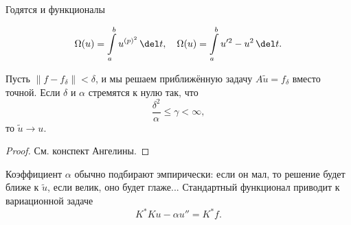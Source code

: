 \documentclass{trlnotes}
\begin{document}
    Годятся и функционалы

    \[
        \Omega(u) = \int\limits_a^b u^{(p)^2} \, \del t, \quad \Omega(u) = \int\limits_a^b u'^2 - u^2 \, \del t.
    \]

    \begin{thm}
        Пусть $\|f - f_{\delta}\| < \delta$, и мы решаем приближённую задачу $A\tilde{u} = f_{\delta}$ вместо точной. Если $\delta$ и $\alpha$ стремятся к нулю так, что 
        \[
            \dfrac{\delta^2}{\alpha} \leqslant \gamma < \infty,
        \]
        то $\tilde{u} \to u$.
        \begin{proof}
            См. конспект Ангелины.
        \end{proof}
    \end{thm}

    Коэффициент $\alpha$ обычно подбирают эмпирически: если он мал, то решение будет ближе к $\tilde{u}$, если велик, оно будет глаже... Стандартный функционал приводит к вариационной задаче
    \[
        K^*Ku - \alpha u'' = K^* f.
    \]
\end{document}

